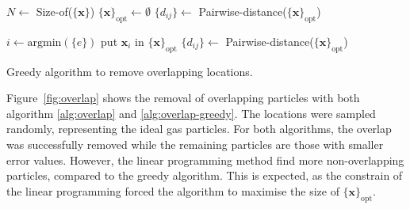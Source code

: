 \documentclass[11pt,twoside]{report}
\begin{document}
\begin{algorithm}
$N \gets$ Size-of($\{ \mathbf{x} \}$)\;
$\{ \mathbf{x} \}_\textrm{opt} \gets \emptyset$\;
$\{d_{ij} \} \gets$ Pairwise-distance($\{ \mathbf{x} \}_\mathrm{opt}$)\;

 {
	$i \gets \textrm{argmin}(\{ e \})$\;
	put $\mathbf{x}_i$ in $\{ \mathbf{x} \}_\mathrm{opt}$\;
	$\{d_{ij} \} \gets$ Pairwise-distance($\{ \mathbf{x} \}_\mathrm{opt}$)\;
}

\caption{Greedy algorithm to remove overlapping locations.}
\label{alg:overlap-greedy}
\end{algorithm}


Figure~\ref{fig:overlap} shows the removal of overlapping particles with both algorithm \ref{alg:overlap} and \ref{alg:overlap-greedy}. The locations were sampled randomly, representing the ideal gas particles. For both algorithms, the overlap was successfully removed while the remaining particles are those with smaller error values.
However, the linear programming method find more non-overlapping particles, compared to the greedy algorithm. This is expected, as the constrain of the linear programming forced the algorithm to maximise the size of $\{\mathbf{x}\}_\textrm{opt}$.
\end{document}
